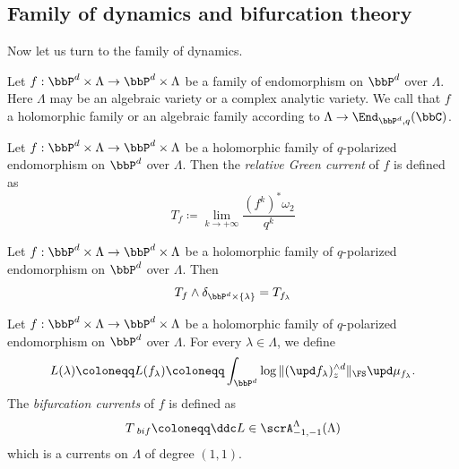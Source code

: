 






\subsection[status=draft,tag=0000000,label=\labelNFM{subsec:family-of-dynamics-and-bifurcation-theorey}]{Family of dynamics and bifurcation theory}

Now let us turn to the family of dynamics.

Let $f: \bbP^d \times \Lambda \to \bbP^d \times \Lambda$ be a family of endomorphism on $\bbP^d$ over $\Lambda$.
Here $\Lambda$ may be an algebraic variety or a complex analytic variety.
We call that $f$ a holomorphic family or an algebraic family according to $\Lambda \to \End_{\bbP^d,q}(\bbC)$.

\begin{definition}[label=\labelNFM{def:relative-green-currents}, status=draft, tag=0000000]
	Let $f: \bbP^d \times \Lambda \to \bbP^d \times \Lambda$ be a holomorphic family of $q$-polarized endomorphism on $\bbP^d$ over $\Lambda$.
	Then the \emph{relative Green current} of $f$ is defined as
	\[ T_f \coloneqq \lim_{k \to +\infty} \frac{(f^k)^*\omega_2}{q^k} \]

	\Yang{}
\end{definition}

\begin{lemma}[label=\labelNFM{lem:relative-green-currents-and-green-currents}, status=draft, tag=0000000]
	Let $f: \bbP^d \times \Lambda \to \bbP^d \times \Lambda$ be a holomorphic family of $q$-polarized endomorphism on $\bbP^d$ over $\Lambda$.
	Then
	\[ T_f \wedge \delta_{\bbP^d \times \{\lambda\}} = T_{f_\lambda} \]
	\Yang{}
\end{lemma}

\begin{definition}[label=\labelNFM{def:bifurcation-currents}, status=draft, tag=0000000]
	Let $f: \bbP^d \times \Lambda \to \bbP^d \times \Lambda$ be a holomorphic family of $q$-polarized endomorphism on $\bbP^d$ over $\Lambda$.
	For every $\lambda \in \Lambda$, we define
	\[ L(\lambda) \coloneqq L(f_\lambda) \coloneqq \int_{\bbP^d} \log \|(\upd f_\lambda)_z^{\wedge d}\|_{\FS} \upd \mu_{f_\lambda}. \]
	The \emph{bifurcation currents} of $f$ is defined as
	\[ T_{\ bif} \coloneqq \ddc L \in \scrA^\Lambda_{-1,-1}(\Lambda) \]
	which is a currents on $\Lambda$ of degree $(1,1)$.
	\Yang{}
\end{definition}

